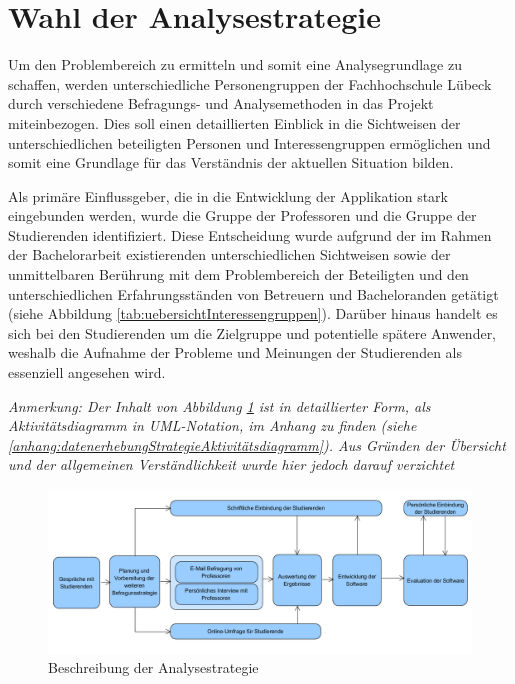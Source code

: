 \documentclass[bibliography=totoc,listof=totoc,BCOR=5mm,DIV=12,oneside]{scrbook}
\begin{document}
\newpage
\section{Wahl der Analysestrategie}
\par Um den Problembereich zu ermitteln und somit eine Analysegrundlage zu schaffen, werden unterschiedliche Personengruppen der Fachhochschule Lübeck durch verschiedene Befragungs- und Analysemethoden in das Projekt miteinbezogen. Dies soll einen detaillierten Einblick in die Sichtweisen der unterschiedlichen beteiligten Personen und Interessengruppen ermöglichen und somit eine Grundlage für das Verständnis der aktuellen Situation bilden.

\par Als primäre Einflussgeber, die in die Entwicklung der Applikation stark eingebunden werden, wurde die Gruppe der Professoren und die Gruppe der Studierenden identifiziert. Diese Entscheidung wurde aufgrund der im Rahmen der Bachelorarbeit existierenden unterschiedlichen Sichtweisen sowie der unmittelbaren Berührung mit dem Problembereich der Beteiligten und den unterschiedlichen Erfahrungsständen von Betreuern und Bacheloranden getätigt (siehe Abbildung \ref{tab:uebersichtInteressengruppen}). Darüber hinaus handelt es sich bei den Studierenden um die Zielgruppe und potentielle spätere Anwender, weshalb die Aufnahme der Probleme und Meinungen der Studierenden als essenziell angesehen wird. 

\par \bigskip \textit{Anmerkung: Der Inhalt von Abbildung \ref{img:analysestrategie} ist in detaillierter Form, als Aktivitätsdiagramm in UML-Notation, im Anhang zu finden (siehe \ref{anhang:datenerhebungStrategieAktivitätsdiagramm}). Aus Gründen der Übersicht und der allgemeinen Verständlichkeit wurde hier jedoch darauf verzichtet}

\bigskip
\begin{figure}[H]
	\centering
	\includegraphics[width=1\textwidth, keepaspectratio]{Bilder/Diagramme/Analysestrategie.png}
	\caption{Beschreibung der Analysestrategie}
	\label{img:analysestrategie}
\end{figure}
\end{document}
